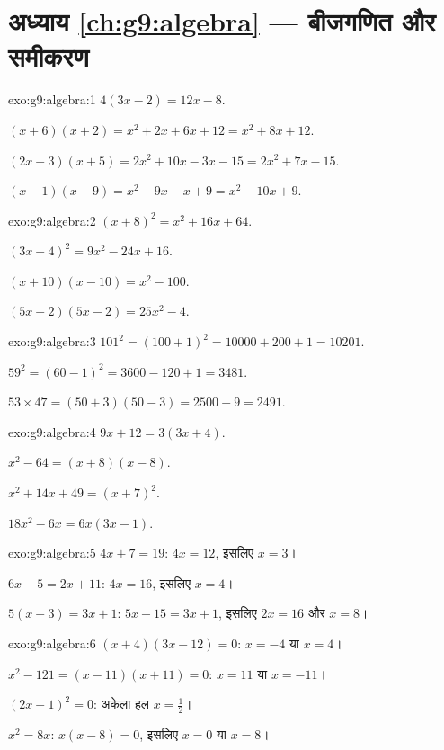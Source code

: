\section*{अध्याय \ref{ch:g9:algebra} --- बीजगणित और समीकरण}

\begin{solution}{exo:g9:algebra:1}
$4(3x - 2) = 12x - 8$.

$(x+6)(x+2) = x^2 + 2x + 6x + 12 = x^2 + 8x + 12$.

$(2x-3)(x+5) = 2x^2 + 10x - 3x - 15 = 2x^2 + 7x - 15$.

$(x-1)(x-9) = x^2 - 9x - x + 9 = x^2 - 10x + 9$.
\end{solution}

\begin{solution}{exo:g9:algebra:2}
$(x+8)^2 = x^2 + 16x + 64$.

$(3x-4)^2 = 9x^2 - 24x + 16$.

$(x+10)(x-10) = x^2 - 100$.

$(5x+2)(5x-2) = 25x^2 - 4$.
\end{solution}

\begin{solution}{exo:g9:algebra:3}
$101^2 = (100+1)^2 = 10000 + 200 + 1 = 10201$.

$59^2 = (60-1)^2 = 3600 - 120 + 1 = 3481$.

$53 \times 47 = (50+3)(50-3) = 2500 - 9 = 2491$.
\end{solution}

\begin{solution}{exo:g9:algebra:4}
$9x + 12 = 3(3x + 4)$.

$x^2 - 64 = (x+8)(x-8)$.

$x^2 + 14x + 49 = (x+7)^2$.

$18x^2 - 6x = 6x(3x - 1)$.
\end{solution}

\begin{solution}{exo:g9:algebra:5}
$4x + 7 = 19$: $4x = 12$, इसलिए $x = 3$।

$6x - 5 = 2x + 11$: $4x = 16$, इसलिए $x = 4$।

$5(x-3) = 3x + 1$: $5x - 15 = 3x + 1$, इसलिए $2x = 16$ और $x = 8$।
\end{solution}

\begin{solution}{exo:g9:algebra:6}
$(x+4)(3x-12) = 0$: $x = -4$ या $x = 4$।

$x^2 - 121 = (x-11)(x+11) = 0$: $x = 11$ या $x = -11$।

$(2x-1)^2 = 0$: अकेला हल $x = \frac12$।

$x^2 = 8x$: $x(x - 8) = 0$, इसलिए $x = 0$ या $x = 8$।
\end{solution}

